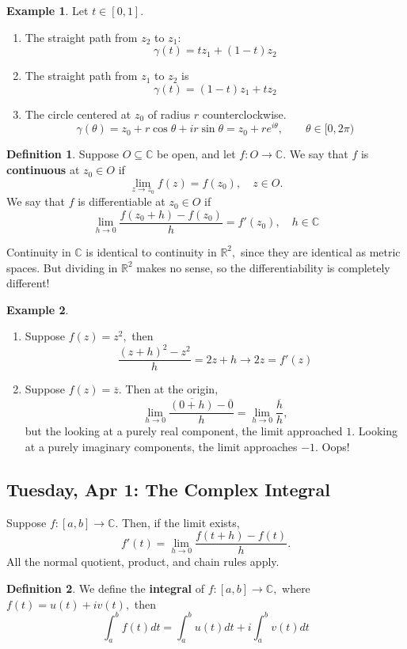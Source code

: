 \documentclass[10pt, oneside]{article}
\newcommand{\bbR}{\mathbb{R}}
\newcommand{\bbC}{\mathbb{C}}
\theoremstyle{definition}
\newtheorem{exmp}{Example}[section]
\newtheorem{defn}{Definition}
\begin{document}
\begin{exmp}
Let $t\in [0,1].$ \begin{enumerate}
    \item The straight path from $z_2$ to $z_1$:
    \[\gamma(t) = tz_1 + (1-t)z_2\]
    \item The straight path from $z_1$ to $z_2$ is 
    \[\gamma(t) = (1-t)z_1 + tz_2\]
    \item The circle centered at $z_0$ of radius $r$ counterclockwise. 
    \[\gamma(\theta) = z_0 + r\cos\theta  + ir\sin\theta = z_0 + re^{i\theta}, \qquad \theta \in [0, 2\pi)\]
\end{enumerate}
\end{exmp}

\begin{defn}
    Suppose $O \subseteq \bbC$ be open, and let $f: O \to \bbC.$ We say that $f$ is \textbf{continuous} at $z_0 \in O$ if 
    \[\lim_{z \to z_0}f(z) = f(z_0), \quad z \in O.\] We say that $f$ is differentiable at $z_0 \in O$ if 
    \[\lim_{h\to 0}\frac{f(z_0 + h) - f(z_0)}{h} = f'(z_0), \quad h \in \bbC\]
\end{defn}
Continuity in $\bbC$ is identical to continuity in $\bbR^2,$ since they are identical as metric spaces. But dividing in $\bbR^2$ makes no sense, so the differentiability is completely different!
\begin{exmp}
    \begin{enumerate}
        \item Suppose $f(z) = z^2,$ then 
        \[\frac{(z + h)^2 - z^2}{h} = 2z + h \to 2z = f'(z)\]
        \item Suppose $f(z) = \overline{z}.$ Then at the origin, 
        \[\lim_{h\to 0}\frac{\overline{(0 + h)} - \overline{0}}{h}= \lim_{h\to 0}\frac{\overline{h}}{h},\] but the looking at a purely real component, the limit approached $1.$ Looking at a purely imaginary components, the limit approaches $-1.$ Oops!
    \end{enumerate}
\end{exmp}

\newpage
\subsection{Tuesday, Apr 1: The Complex Integral}
Suppose $f: [a,b] \to \bbC.$ Then, if the limit exists,
\[f'(t) = \lim_{h\to 0}\frac{f(t+  h) - f(t)}{h}.\] All the normal quotient, product, and chain rules apply.

\begin{defn}
    We define the \textbf{integral} of $f: [a,b] \to \bbC,$ where $f(t) = u(t) + iv(t),$ then 
    \[\int_a^b f(t)dt = \int_a^b u(t)dt + i \int_a^b v(t)dt\]
\end{defn}
\end{document}
